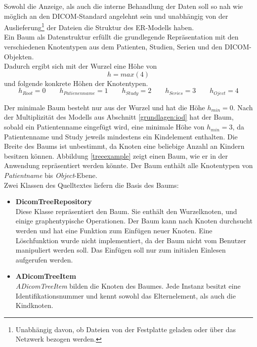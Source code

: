 Sowohl die Anzeige, als auch die interne Behandlung der Daten soll so nah wie möglich an den DICOM-Standard angelehnt sein und unabhängig von der Auslieferung\footnote{Unabhängig davon, ob Dateien von der Festplatte geladen oder über das Netzwerk bezogen werden.} der Dateien die Struktur des ER-Modells haben.\\
Ein Baum als Datenstruktur erfüllt die grundlegende Repräsentation mit den verschiedenen Knotentypen aus dem Patienten, Studien, Serien und den DICOM-Objekten.\\
Dadurch ergibt sich mit der Wurzel eine Höhe von
\begin{equation}
h = max(4)
\label{baumheight}
\end{equation}
und folgende konkrete Höhen der Knotentypen.
\begin{equation}
h_{Root} = 0 \qquad
h_{Patienenname} = 1 \qquad 
h_{Study} = 2 \qquad
h_{Series} = 3 \qquad
h_{Oject} = 4
\label{heights}
\end{equation}

Der minimale Baum besteht nur aus der Wurzel und hat die Höhe $h_{min} = 0$. Nach der Multiplizität des Modells aus Abschnitt \ref{grundlagen:iod} hat der Baum, sobald ein Patientenname eingefügt wird, eine minimale Höhe von $h_{min} = 3$, da Patientenname und Study jeweils mindestens ein Kindelement enthalten. Die Breite des Baums ist unbestimmt, da Knoten eine beliebige Anzahl an Kindern besitzen können. Abbildung \ref{treeexample} zeigt einen Baum, wie er in der Anwendung repräsentiert werden könnte. Der Baum enthält alle Knotentypen von \textit{Patientname} bis \textit{Object}-Ebene.\\
Zwei Klassen des Quelltextes liefern die Basis des Baums:

\begin{itemize}
\item \textbf{DicomTreeRepository}\\
	  Diese Klasse repräsentiert den Baum. Sie enthält den Wurzelknoten, und einige graphentypische Operationen. Der Baum kann nach Knoten durchsucht werden und hat eine Funktion zum Einfügen neuer Knoten. Eine Löschfunktion wurde nicht implementiert, da der Baum nicht vom Benutzer manipuliert werden soll. Das Einfügen soll nur zum initialen Einlesen aufgerufen werden.
\item \textbf{ADicomTreeItem}\\
	  \textit{ADicomTreeItem} bilden die Knoten des Baumes. Jede Instanz besitzt eine Identifikationsnummer und kennt sowohl das Elternelement, als auch die Kindknoten. 
\end{itemize}

